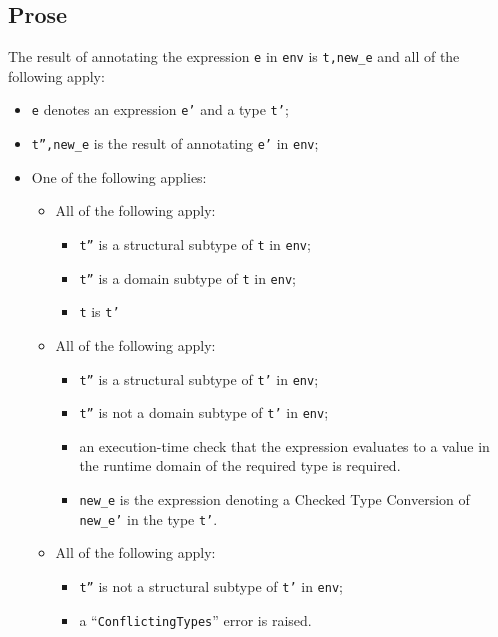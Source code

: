 \documentclass{book}
\begin{document}
  \subsection{Prose}
  The result of annotating the expression \texttt{e} in \texttt{env} is
\texttt{t,new\_e} and all of the following apply:
  \begin{itemize}
  \item \texttt{e} denotes an expression \texttt{e'} and a type \texttt{t'};
  \item \texttt{t'',new\_e} is the result of annotating \texttt{e'} in \texttt{env};
  \item One of the following applies:
    \begin{itemize}
    \item All of the following apply:
      \begin{itemize}
      \item \texttt{t''} is a structural subtype of \texttt{t} in \texttt{env};
      \item \texttt{t''} is a domain subtype of \texttt{t} in \texttt{env};
      \item \texttt{t} is \texttt{t'}
      \end{itemize}
    \item All of the following apply:
      \begin{itemize}
      \item \texttt{t''} is a structural subtype of \texttt{t'} in \texttt{env};
      \item \texttt{t''} is not a domain subtype of \texttt{t'} in \texttt{env};
      \item an execution-time check that the expression evaluates to a value in the
        runtime domain of the required type is required.
      \item \texttt{new\_e} is the expression denoting a Checked Type
        Conversion of \texttt{new\_e'} in the type \texttt{t'}.
     \end{itemize}
   \item All of the following apply:
     \begin{itemize}
     \item \texttt{t''} is not a structural subtype of \texttt{t'} in \texttt{env};
     \item a ``\texttt{ConflictingTypes}'' error is raised.
     \end{itemize}
   \end{itemize}
  \end{itemize}
\end{document}
